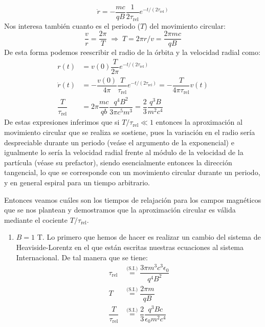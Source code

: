 \documentclass[11pt]{article}
\newcommand{\trel}{\tau_\textrm{rel}}
\begin{document}
\begin{enumerate}[label=\roman*{})]
\begin{equation}
        \dot{r} = -\dfrac{mc}{qB}\dfrac{1}{2\trel}e^{-t/(2\trel)}\label{eq: vel. radial} 
    \end{equation}
    Nos interesa también cuanto es el periodo ($T$) del movimiento circular: 
    \begin{equation}
        \dfrac{v}{r} = \dfrac{2\pi}{T} \;\Rightarrow\; T = 2\pi r/v = \dfrac{2\pi mc}{qB}
    \end{equation}
    De esta forma podemos reescribir el radio de la órbita y la velocidad radial como: 
    \begin{align}
        r(t) &= v(0) \dfrac{T}{2\pi}e^{-t/(2\trel)}\\ 
        \dot{r}(t) &= -\dfrac{v(0)}{4\pi}\dfrac{T}{\trel}e^{-t/(2\trel)} = -\dfrac{T}{4\pi \trel} v(t)\\
        \dfrac{T}{\trel} &= 2\pi\dfrac{mc}{qb}\dfrac{q^4B^2}{3\pi c^5 m^3} = \dfrac{2}{3} \dfrac{q^3 B}{m^2 c^4}
    \end{align}
    De estas expresiones inferimos que si $T/\trel\ll 1$ entonces la aproximación al movimiento circular que se realiza se sostiene, pues la variación en el radio sería despreciable durante un periodo (veáse el argumento de la exponencial) e igualmente lo sería la velocidad radial frente al módulo de la velocidad de la partícula (véase su prefactor), siendo esencialmente entonces la dirección tangencial, lo que se corresponde con un movimiento circular durante un periodo, y en general espiral para un tiempo arbitrario.\par 
    Entonces veamos cuáles son los tiempos de relajación para los campos magnéticos que se nos plantean y demostramos que la aproximación circular es válida mediante el cociente $T/\trel$. 
    \begin{enumerate}[label=\alph*)]
        \item $B = 1$ T. Lo primero que hemos de hacer es realizar un cambio del sistema de Heaviside-Lorentz en el que están escritas nuestras ecuaciones al sistema Internacional. De tal manera que se tiene: 
        \begin{align}
            \trel &\overset{\textrm{(S.I.)}}{=} \dfrac{3\pi m^3 c^3 \epsilon_0}{q^4 B^2}\label{eq: trel_SI}\\ 
            T &\overset{\textrm{(S.I.)}}{=} \dfrac{2\pi m}{q B}\label{eq: T_SI}\\ 
            \dfrac{T}{\trel} &\overset{\textrm{(S.I.)}}{=} \dfrac{2}{3} \dfrac{q^3 B c}{\epsilon_0 m^2 c^4 }\label{eq: T/trel_SI} 
        \end{align}

\end{enumerate}
\end{enumerate}
\end{document}
